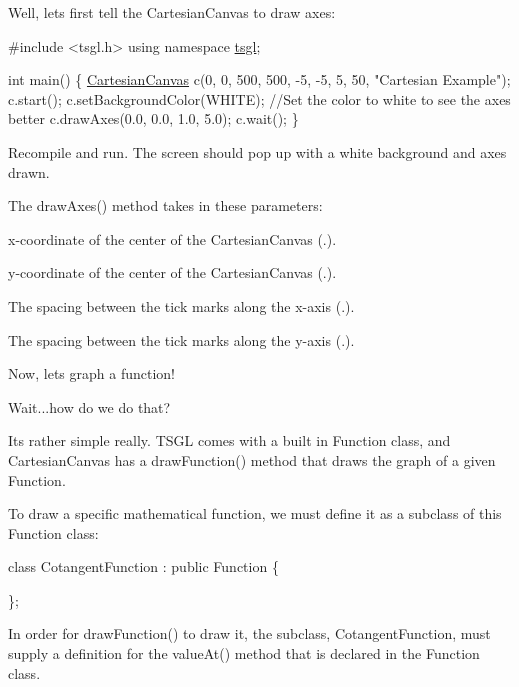 Well, let\textquotesingle{}s first tell the Cartesian\+Canvas to draw axes\+:


\begin{DoxyCode}
\textcolor{preprocessor}{#include <tsgl.h>}
\textcolor{keyword}{using namespace }\hyperlink{namespacetsgl}{tsgl};

\textcolor{keywordtype}{int} main() \{
  \hyperlink{classtsgl_1_1_cartesian_canvas}{CartesianCanvas} c(0, 0, 500, 500, -5, -5, 5, 50, \textcolor{stringliteral}{"Cartesian Example"});
  c.start();
  c.setBackgroundColor(WHITE);  \textcolor{comment}{//Set the color to white to see the axes better}
  c.drawAxes(0.0, 0.0, 1.0, 5.0);
  c.wait();
\}
\end{DoxyCode}


Recompile and run. The screen should pop up with a white background and axes drawn.

The draw\+Axes() method takes in these parameters\+:
\begin{DoxyItemize}
\item x-\/coordinate of the center of the Cartesian\+Canvas ({.}).
\item y-\/coordinate of the center of the Cartesian\+Canvas ({.}).
\item The spacing between the tick marks along the x-\/axis ({.}).
\item The spacing between the tick marks along the y-\/axis ({.}).
\end{DoxyItemize}

Now, let\textquotesingle{}s graph a function!

Wait...how do we do that?

It\textquotesingle{}s rather simple really. T\+S\+G\+L comes with a built in Function class, and Cartesian\+Canvas has a draw\+Function() method that draws the graph of a given Function.

To draw a specific mathematical function, we must define it as a subclass of this Function class\+:


\begin{DoxyCode}
\textcolor{keyword}{class }CotangentFunction : \textcolor{keyword}{public} Function \{

\};
\end{DoxyCode}


In order for draw\+Function() to draw it, the subclass, Cotangent\+Function, must supply a definition for the value\+At() method that is declared in the Function class.

